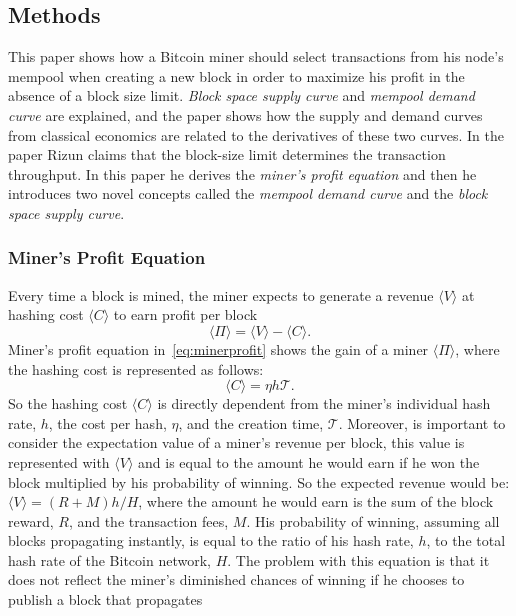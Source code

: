 \subsection{Methods}
This paper shows how a Bitcoin miner should
select transactions from his node's mempool
when creating a new block in order to maximize
his profit in the absence of a block size limit.
\emph{Block space supply curve} and
\emph{mempool demand curve} are explained, and the
paper shows how the supply and demand
curves from classical economics are related to the
derivatives of these two curves.
In the paper Rizun claims that the block-size limit determines the
transaction throughput. In this paper he derives
the \emph{miner's profit equation} and then
he introduces two novel concepts called
the \emph{mempool demand curve} and the
\emph{block space supply curve}.
\subsubsection{Miner's Profit Equation}
Every time a block is mined, the miner expects to
generate a revenue $\langle V \rangle$
at hashing cost $\langle C \rangle$ to earn profit per block
\begin{equation}
\label{eq:minerprofit}
\langle \Pi \rangle = \langle V\rangle - \langle C\rangle.
\end{equation}
Miner's profit equation in~\ref{eq:minerprofit}
shows the gain of a miner $\langle \Pi \rangle$,
where the hashing cost is represented as follows:
\begin{equation}
\label{eq:hashingcost}
\langle C\rangle = \eta h\mathcal{T}.
\end{equation}
So the hashing cost $\langle C\rangle$ is
directly dependent from the miner's individual hash rate, $h$,
the cost per hash, $\eta$, and the creation time, $\mathcal{T}$.
Moreover, is important to consider the
expectation value of a miner's revenue per block,
this value is represented with $\langle V\rangle$
and is equal to the amount he would earn if he won
the block multiplied by his probability of
winning. So the expected revenue would be:
$\langle V\rangle = (R + M) h/H$,
where the amount he would earn is the sum of
the block reward, $R$, and the transaction fees, $M$.
His probability of winning, assuming all blocks propagating
instantly, is equal to the ratio of his hash
rate, $h$, to the total hash rate of the Bitcoin network,
$H$. The problem with this equation is that it
does not reflect the miner's diminished chances of
winning if he chooses to publish a block that propagates
